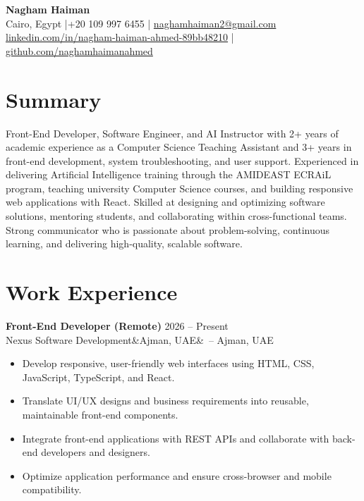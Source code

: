 \documentclass[letterpaper,11pt]{article}
\newcommand{\job}[4]{%
  \textbf{#1} \hfill #4\\
  #2\ifx&#3&\else\ -- #3\fi\par\vspace{1pt}}
\begin{document}
\begin{center}
  {\LARGE\bfseries Nagham Haiman}\\[4pt]
  Cairo, Egypt \quad|\quad +20 109 997 6455 \quad|\quad
  \href{mailto:naghamhaiman2@gmail.com}{naghamhaiman2@gmail.com}\\[2pt]
  \href{https://www.linkedin.com/in/nagham-haiman-ahmed-89bb48210/}{linkedin.com/in/nagham-haiman-ahmed-89bb48210}
  \quad|\quad
  \href{https://github.com/naghamhaimanahmed}{github.com/naghamhaimanahmed}
\end{center}

\section{Summary}
Front-End Developer, Software Engineer, and AI Instructor with 2+ years of academic experience as a
Computer Science Teaching Assistant and 3+ years in front-end development,
system troubleshooting, and user support. Experienced in delivering Artificial
Intelligence training through the AMIDEAST ECRAiL program, teaching university
Computer Science courses, and building responsive web applications with React.
Skilled at designing and optimizing software solutions, mentoring students, and
collaborating within cross-functional teams. Strong communicator who is
passionate about problem-solving, continuous learning, and delivering
high-quality, scalable software.

\section{Work Experience}

\job{Front-End Developer (Remote)}{Nexus Software Development}{Ajman, UAE}{2026 -- Present}
\begin{itemize}
  \item Develop responsive, user-friendly web interfaces using HTML, CSS,
        JavaScript, TypeScript, and React.
  \item Translate UI/UX designs and business requirements into reusable,
        maintainable front-end components.
  \item Integrate front-end applications with REST APIs and collaborate with
        back-end developers and designers.
  \item Optimize application performance and ensure cross-browser and
        mobile compatibility.
\end{itemize}
\end{document}
